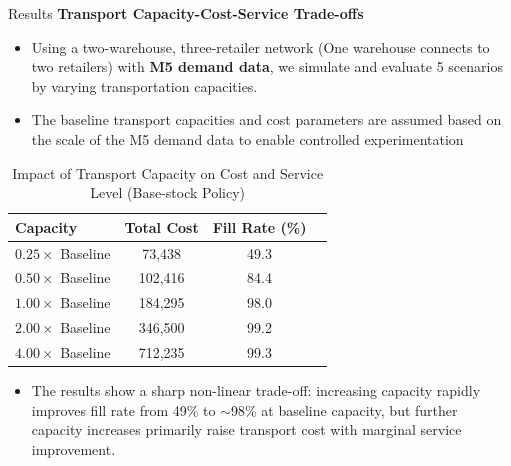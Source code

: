 \documentclass[final]{beamer}
\newlength{\colwidth}
\begin{document}
\begin{frame}[t]
\begin{columns}[t]
\begin{column}{\colwidth}
\begin{block}{Results}
				\textbf{Transport Capacity-Cost-Service Trade-offs}
				\begin{itemize}
				\item Using a two-warehouse, three-retailer network (One warehouse connects to two retailers) with \textbf{M5 demand data},
				we simulate and evaluate 5 scenarios by varying transportation capacities.
				\item The baseline transport capacities and cost parameters are assumed
				based on the scale of the M5 demand data to enable controlled experimentation
				\end{itemize}
				\vspace{-0.7em}
				\begin{table}[t]
				\centering
				\setlength{\tabcolsep}{14pt}
				\caption{Impact of Transport Capacity on Cost and Service Level (Base-stock Policy)}
				\begin{tabular}{lccc}
				\toprule
				\textbf{Capacity} & \textbf{Total Cost} & \textbf{Fill Rate (\%)} \\
				\midrule
				$0.25\times$ Baseline & 73,438  & 49.3 \\
				$0.50\times$ Baseline & 102,416 & 84.4 \\
				$1.00\times$ Baseline & 184,295 & 98.0 \\
				$2.00\times$ Baseline & 346,500 & 99.2 \\
				$4.00\times$ Baseline & 712,235 & 99.3 \\
				\bottomrule
				\end{tabular}
				\end{table}

				\begin{itemize}

				\item The results show a sharp non-linear trade-off: increasing capacity rapidly improves fill rate 
				from 49\% to $\sim$98\% at baseline capacity, but further capacity increases primarily raise transport cost 
				with marginal service improvement.
				\end{itemize}




				
			\end{block}
			

\end{column}
\end{columns}
\end{frame}
\end{document}
